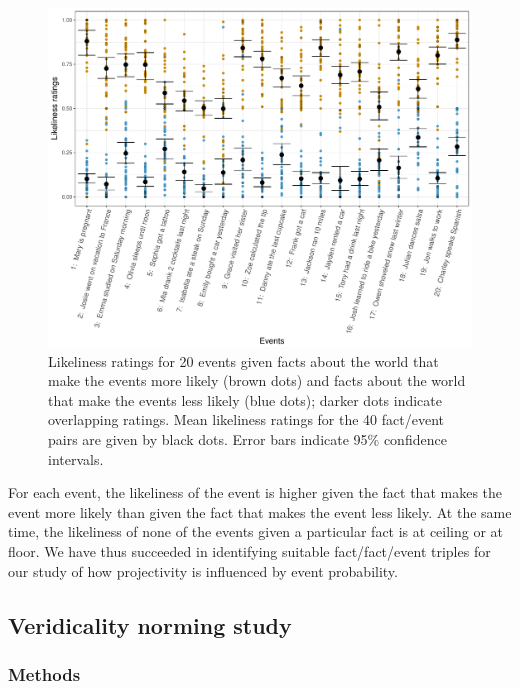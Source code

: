 \documentclass[11pt,fleqn]{article}
\newcommand{\6}{\mbox{$[\hspace*{-.6mm}[$}}
\newcommand{\9}{\mbox{$]\hspace*{-.6mm}]$}}
\begin{document}
\begin{figure}
\centering

\includegraphics[width=.8\paperwidth]{../results/1-prior/graphs/target-ratings}

\caption{Likeliness ratings for 20 events given facts about the world that make the events more likely (brown dots) and facts about the world that make the events less likely (blue dots); darker dots indicate overlapping ratings. Mean likeliness ratings for the 40 fact/event pairs are given by black dots. Error bars indicate 95\% confidence intervals.}\label{f-priors}
\end{figure}

For each event, the likeliness of the event is higher given the fact that makes the event more likely than given the fact that makes the event less likely. At the same time, the likeliness of none of the events given a particular fact is at ceiling or at floor. We have thus succeeded in identifying suitable fact/fact/event triples for our study of how projectivity is influenced by event probability.

\subsection{Veridicality norming study}\label{s-pretest2}

\subsubsection{Methods}\label{s-methods-2}
\end{document}
